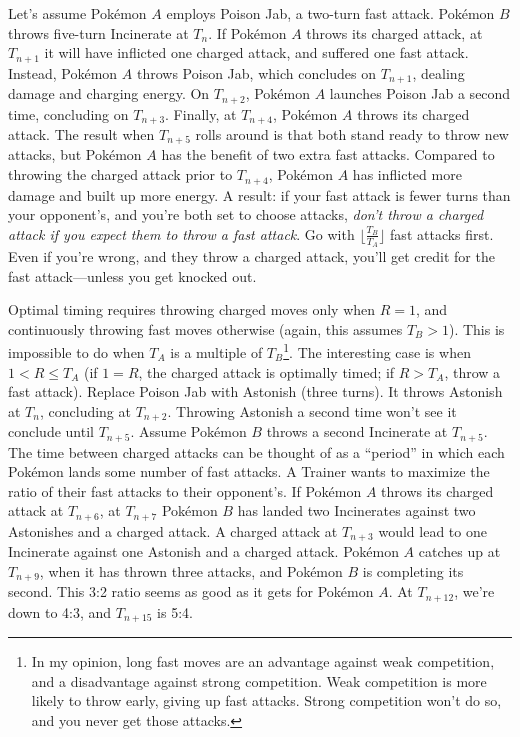 Let's assume Pokémon $A$ employs Poison Jab, a two-turn fast attack.
Pokémon $B$ throws five-turn Incinerate at $T_n$.
If Pokémon $A$ throws its charged attack, at $T_{n+1}$ it will have inflicted
  one charged attack, and suffered one fast attack.
Instead, Pokémon $A$ throws Poison Jab, which concludes on $T_{n+1}$, dealing damage and charging energy.
On $T_{n+2}$, Pokémon $A$ launches Poison Jab a second time, concluding on $T_{n+3}$.
Finally, at $T_{n+4}$, Pokémon $A$ throws its charged attack.
The result when $T_{n+5}$ rolls around is that both stand ready to throw new attacks,
  but Pokémon $A$ has the benefit of two extra fast attacks.
Compared to throwing the charged attack prior to $T_{n+4}$,
  Pokémon $A$ has inflicted more damage and built up more energy.
A result: if your fast attack is fewer turns than your opponent's,
 and you're both set to choose attacks,
 \textit{don't throw a charged attack if you expect them to throw a fast attack}.
Go with $\lfloor\frac{T_B}{T_A}\rfloor$ fast attacks first.
Even if you're wrong, and they throw a charged attack, you'll get credit for the fast attack---unless you get knocked out.

Optimal timing requires throwing charged moves only when $R=1$, and continuously throwing fast moves otherwise
 (again, this assumes $T_B > 1$).
This is impossible to do when $T_A$ is a multiple of $T_B$\footnote{In my opinion, long fast moves are an advantage against weak competition, and a disadvantage
 against strong competition. Weak competition is more likely to throw early, giving up fast attacks. Strong competition
 won't do so, and you never get those attacks.}.
 The interesting case is when $1 < R \le T_A$ (if $1=R$, the charged attack is optimally timed; if $R > T_A$, throw a fast attack).
Replace Poison Jab with Astonish (three turns).
It throws Astonish at $T_n$, concluding at $T_{n+2}$.
Throwing Astonish a second time won't see it conclude until $T_{n+5}$.
Assume Pokémon $B$ throws a second Incinerate at $T_{n+5}$.
The time between charged attacks can be thought of as a ``period''
 in which each Pokémon lands some number of fast attacks.
A Trainer wants to maximize the ratio of their fast attacks to their opponent's.
If Pokémon $A$ throws its charged attack at $T_{n+6}$, at $T_{n+7}$ Pokémon $B$ has landed two Incinerates
  against two Astonishes and a charged attack.
A charged attack at $T_{n+3}$ would lead to one Incinerate against one Astonish
  and a charged attack.
Pokémon $A$ catches up at $T_{n+9}$, when it has thrown three attacks, and Pokémon $B$ is
  completing its second.
This 3:2 ratio seems as good as it gets for Pokémon $A$.
At $T_{n+12}$, we're down to 4:3, and $T_{n+15}$ is 5:4.

